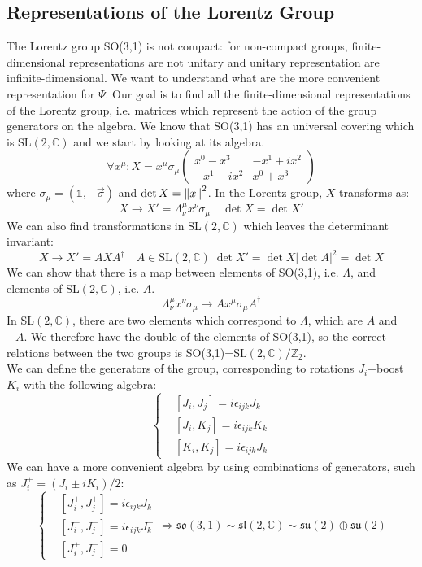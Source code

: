 \documentclass[../main.tex]{subfiles}
\begin{document}
\subsection{Representations of the Lorentz Group}
The Lorentz group SO(3,1) is not compact: for non-compact groups, finite-dimensional representations are not unitary and unitary representation are infinite-dimensional. We want to understand what are the more convenient representation for $\Psi$. Our goal is to find all the finite-dimensional representations of the Lorentz group, i.e. matrices which represent the action of the group generators on the algebra. We know that SO(3,1) has an universal covering which is SL$(2,\mathbb{C})$ and we start by looking at its algebra.
\[
\forall x^\mu: X=x^\mu\sigma_\mu\left(\begin{array}{cc}
    x^0-x^3 & -x^1+ix^2 \\
    -x^1-ix^2 & x^0+x^3
\end{array}\right)
\]
where $\sigma_\mu=(\mathbb{1},-\Vec{\sigma})$ and $\det X=\norm{x}^2$. In the Lorentz group, $X$ transforms as:
\[
X\to X'=\Lambda^\mu_\nu x^\nu\sigma_\mu \quad \det X=\det X'
\]
We can also find transformations in SL$(2,\mathbb{C})$ which leaves the determinant invariant:
\[
X\to X'=AXA^\dagger \quad A\in\text{SL}(2,\mathbb{C}) \; \det X'=\det X|\det A|^2=\det X
\]
We can show that there is a map between elements of SO(3,1), i.e. $\Lambda$, and elements of SL$(2,\mathbb{C})$, i.e. $A$.
\[
\Lambda^\mu_\nu x^\nu\sigma_\mu\to Ax^\mu\sigma_\mu A^\dagger
\]
In SL$(2,\mathbb{C})$, there are two elements which correspond to $\Lambda$, which are $A$ and $-A$. We therefore have the double of the elements of SO(3,1), so the correct relations between the two groups is SO(3,1)=SL$(2,\mathbb{C})/\mathbb{Z}_2$.\\
We can define the generators of the group, corresponding to rotations $J_i$+boost $K_i$ with the following algebra:
\[
\left\{
\begin{aligned}
&[J_i,J_j]=i\epsilon_{ijk}J_k\\
&[J_i,K_j]=i\epsilon_{ijk}K_k\\
&[K_i,K_j]=i\epsilon_{ijk}J_k
\end{aligned}
\right.
\]
We can have a more convenient algebra by using combinations of generators, such as $J_i^\pm=(J_i\pm iK_i)/2$:
\[
\left\{
\begin{aligned}
&[J_i^+,J_j^+]=i\epsilon_{ijk}J^+_k\\
&[J_i^-,J_j^-]=i\epsilon_{ijk}J_k^-\\
&[J_i^+,J_j^-]=0
\end{aligned}
\right.
\Rightarrow
\mathfrak{so}(3,1)\sim\mathfrak{sl}(2,\mathbb{C})\sim\mathfrak{su}(2)\oplus\mathfrak{su}(2)
\]
\end{document}

